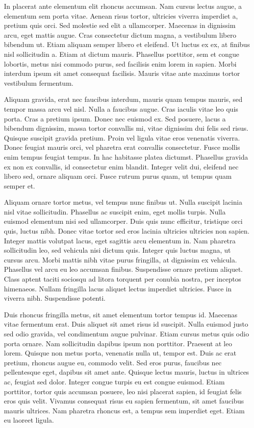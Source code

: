 In placerat ante elementum elit rhoncus accumsan. Nam cursus lectus augue, a elementum sem porta vitae. Aenean risus tortor, ultricies viverra imperdiet a, pretium quis orci. Sed molestie sed elit a ullamcorper. Maecenas in dignissim arcu, eget mattis augue. Cras consectetur dictum magna, a vestibulum libero bibendum ut. Etiam aliquam semper libero et eleifend. Ut luctus ex ex, at finibus nisl sollicitudin a. Etiam at dictum mauris. Phasellus porttitor, sem et congue lobortis, metus nisi commodo purus, sed facilisis enim lorem in sapien. Morbi interdum ipsum sit amet consequat facilisis. Mauris vitae ante maximus tortor vestibulum fermentum.

Aliquam gravida, erat nec faucibus interdum, mauris quam tempus mauris, sed tempor massa arcu vel nisl. Nulla a faucibus augue. Cras iaculis vitae leo quis porta. Cras a pretium ipsum. Donec nec euismod ex. Sed posuere, lacus a bibendum dignissim, massa tortor convallis mi, vitae dignissim dui felis sed risus. Quisque suscipit gravida pretium. Proin vel ligula vitae eros venenatis viverra. Donec feugiat mauris orci, vel pharetra erat convallis consectetur. Fusce mollis enim tempus feugiat tempus. In hac habitasse platea dictumst. Phasellus gravida ex non ex convallis, id consectetur enim blandit. Integer velit dui, eleifend nec libero sed, ornare aliquam orci. Fusce rutrum purus quam, ut tempus quam semper et.

Aliquam ornare tortor metus, vel tempus nunc finibus ut. Nulla suscipit lacinia nisl vitae sollicitudin. Phasellus ac suscipit enim, eget mollis turpis. Nulla euismod elementum nisi sed ullamcorper. Duis quis nunc efficitur, tristique orci quis, luctus nibh. Donec vitae tortor sed eros lacinia ultricies ultricies non sapien. Integer mattis volutpat lacus, eget sagittis arcu elementum in. Nam pharetra sollicitudin leo, sed vehicula nisi dictum quis. Integer quis luctus magna, ut cursus arcu. Morbi mattis nibh vitae purus fringilla, at dignissim ex vehicula. Phasellus vel arcu eu leo accumsan finibus. Suspendisse ornare pretium aliquet. Class aptent taciti sociosqu ad litora torquent per conubia nostra, per inceptos himenaeos. Nullam fringilla lacus aliquet lectus imperdiet ultricies. Fusce in viverra nibh. Suspendisse potenti.

Duis rhoncus fringilla metus, sit amet elementum tortor tempus id. Maecenas vitae fermentum erat. Duis aliquet sit amet risus id suscipit. Nulla euismod justo sed odio gravida, vel condimentum augue pulvinar. Etiam cursus metus quis odio porta ornare. Nam sollicitudin dapibus ipsum non porttitor. Praesent at leo lorem. Quisque non metus porta, venenatis nulla ut, tempor est. Duis ac erat pretium, rhoncus augue eu, commodo velit. Sed eros purus, faucibus nec pellentesque eget, dapibus sit amet ante. Quisque lectus mauris, luctus in ultrices ac, feugiat sed dolor. Integer congue turpis eu est congue euismod. Etiam porttitor, tortor quis accumsan posuere, leo nisi placerat sapien, id feugiat felis eros quis velit. Vivamus consequat risus eu sapien fermentum, sit amet faucibus mauris ultrices. Nam pharetra rhoncus est, a tempus sem imperdiet eget. Etiam eu laoreet ligula.

